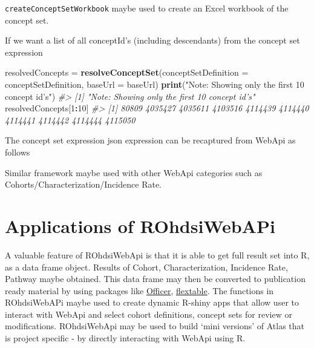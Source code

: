 \documentclass[
]{article}
\newenvironment{Shaded}{\begin{snugshade}}{\end{snugshade}}
\newcommand{\CommentTok}[1]{\textcolor[rgb]{0.56,0.35,0.01}{\textit{#1}}}
\newcommand{\DataTypeTok}[1]{\textcolor[rgb]{0.13,0.29,0.53}{#1}}
\newcommand{\DecValTok}[1]{\textcolor[rgb]{0.00,0.00,0.81}{#1}}
\newcommand{\KeywordTok}[1]{\textcolor[rgb]{0.13,0.29,0.53}{\textbf{#1}}}
\newcommand{\NormalTok}[1]{#1}
\newcommand{\OperatorTok}[1]{\textcolor[rgb]{0.81,0.36,0.00}{\textbf{#1}}}
\newcommand{\OtherTok}[1]{\textcolor[rgb]{0.56,0.35,0.01}{#1}}
\newcommand{\StringTok}[1]{\textcolor[rgb]{0.31,0.60,0.02}{#1}}
\begin{document}
\texttt{createConceptSetWorkbook} maybe used to create an Excel workbook
of the concept set.

If we want a list of all conceptId's (including descendants) from the
concept set expression

\begin{Shaded}
\begin{Highlighting}[]
\NormalTok{resolvedConcepts =}\StringTok{ }\KeywordTok{resolveConceptSet}\NormalTok{(}\DataTypeTok{conceptSetDefinition =}\NormalTok{ conceptSetDefinition, }\DataTypeTok{baseUrl =}\NormalTok{ baseUrl)}
\KeywordTok{print}\NormalTok{(}\StringTok{"Note: Showing only the first 10 concept id's"}\NormalTok{)}
\CommentTok{#> [1] "Note: Showing only the first 10 concept id's"}
\NormalTok{resolvedConcepts[}\DecValTok{1}\OperatorTok{:}\DecValTok{10}\NormalTok{]}
\CommentTok{#>  [1]   80809 4035427 4035611 4103516 4114439 4114440 4114441 4114442 4114444 4115050}
\end{Highlighting}
\end{Shaded}

The concept set expression json expression can be recaptured from WebApi
as follows

\begin{Shaded}
\end{Shaded}

Similar framework maybe used with other WebApi categories such as
Cohorts/Characterization/Incidence Rate.

\hypertarget{applications-of-rohdsiwebapi}{%
\section{Applications of
ROhdsiWebAPi}\label{applications-of-rohdsiwebapi}}

A valuable feature of ROhdsiWebApi is that it is able to get full result
set into R, as a data frame object. Results of Cohort, Characterization,
Incidence Rate, Pathway maybe obtained. This data frame may then be
converted to publication ready material by using packages like
\href{https://davidgohel.github.io/officer/}{Officer},
\href{https://davidgohel.github.io/flextable/}{flextable}. The functions
in ROhdsiWebAPi maybe used to create dynamic R-shiny apps that allow
user to interact with WebApi and select cohort definitions, concept sets
for review or modifications. ROhdsiWebApi may be used to build `mini
versions' of Atlas that is project specific - by directly interacting
with WebApi using R.
\end{document}
